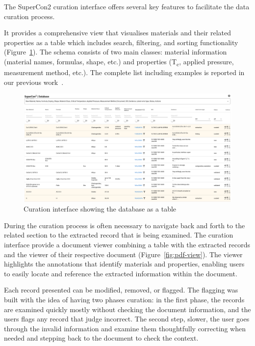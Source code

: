 \documentclass[a4paper]{article}
\begin{document}
The SuperCon2 curation interface offers several key features to facilitate the data curation process.

It provides a comprehensive view that visualises materials and their related properties as a table which includes search, filtering, and sorting functionality (Figure~\ref{fig:curation-interface-database}). 
The schema consists of two main classes: material information (material names, formulas, shape, etc.) and properties (T\textsubscript{c}, applied pressure, measurement method, etc.). The complete list including examples is reported in our previous work~\cite{lfoppiano2023automatic}.

\begin{figure}[t]
  \centering
  \includegraphics[width=1\textwidth]{images/supercon-curation-database} 
  \caption{Curation interface showing the database as a table}
  \label{fig:curation-interface-database}
\end{figure}


During the curation process is often necessary to navigate back and forth to the related section to the extracted record that is being examined. The curation interface provide a document viewer combining a table with the extracted records and the viewer of their respective document (Figure~\ref{fig:pdf-view}). The viewer highlights the annotations that identify materials and properties, enabling users to easily locate and reference the extracted information within the document.

Each record presented can be modified, removed, or flagged. The flagging was built with the idea of having two phases curation: in the first phase, the records are examined quickly mostly without checking the document information, and the users flags any record that judge incorrect. The second step, slower, the user goes through the invalid information and examine them thoughtfully correcting when needed and stepping back to the document to check the context. 
\end{document}

